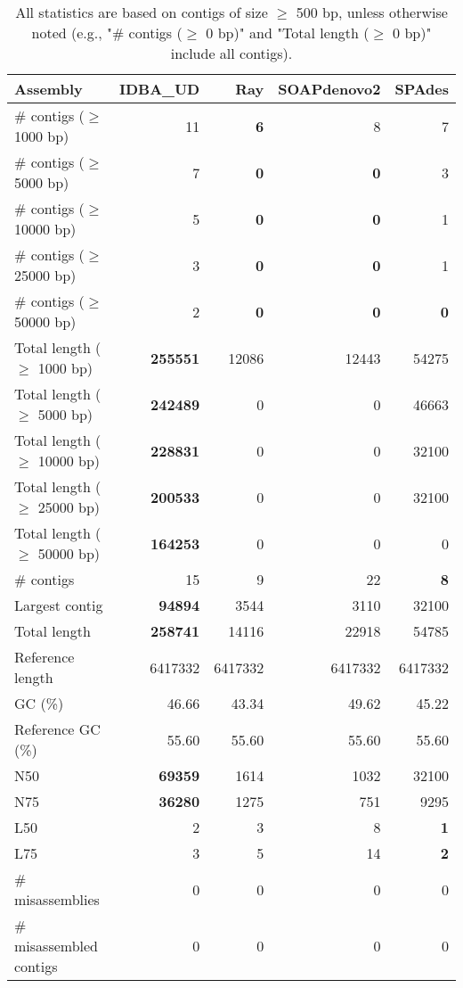 \documentclass[12pt,a4paper]{article}
\begin{document}
\begin{table}[ht]
\begin{center}
\caption{All statistics are based on contigs of size $\geq$ 500 bp, unless otherwise noted (e.g., "\# contigs ($\geq$ 0 bp)" and "Total length ($\geq$ 0 bp)" include all contigs).}
\begin{tabular}{|l*{4}{|r}|}
\hline
Assembly & IDBA\_UD & Ray & SOAPdenovo2 & SPAdes \\ \hline
\# contigs ($\geq$ 1000 bp) & 11 & {\bf 6} & 8 & 7 \\ \hline
\# contigs ($\geq$ 5000 bp) & 7 & {\bf 0} & {\bf 0} & 3 \\ \hline
\# contigs ($\geq$ 10000 bp) & 5 & {\bf 0} & {\bf 0} & 1 \\ \hline
\# contigs ($\geq$ 25000 bp) & 3 & {\bf 0} & {\bf 0} & 1 \\ \hline
\# contigs ($\geq$ 50000 bp) & 2 & {\bf 0} & {\bf 0} & {\bf 0} \\ \hline
Total length ($\geq$ 1000 bp) & {\bf 255551} & 12086 & 12443 & 54275 \\ \hline
Total length ($\geq$ 5000 bp) & {\bf 242489} & 0 & 0 & 46663 \\ \hline
Total length ($\geq$ 10000 bp) & {\bf 228831} & 0 & 0 & 32100 \\ \hline
Total length ($\geq$ 25000 bp) & {\bf 200533} & 0 & 0 & 32100 \\ \hline
Total length ($\geq$ 50000 bp) & {\bf 164253} & 0 & 0 & 0 \\ \hline
\# contigs & 15 & 9 & 22 & {\bf 8} \\ \hline
Largest contig & {\bf 94894} & 3544 & 3110 & 32100 \\ \hline
Total length & {\bf 258741} & 14116 & 22918 & 54785 \\ \hline
Reference length & 6417332 & 6417332 & 6417332 & 6417332 \\ \hline
GC (\%) & 46.66 & 43.34 & 49.62 & 45.22 \\ \hline
Reference GC (\%) & 55.60 & 55.60 & 55.60 & 55.60 \\ \hline
N50 & {\bf 69359} & 1614 & 1032 & 32100 \\ \hline
N75 & {\bf 36280} & 1275 & 751 & 9295 \\ \hline
L50 & 2 & 3 & 8 & {\bf 1} \\ \hline
L75 & 3 & 5 & 14 & {\bf 2} \\ \hline
\# misassemblies & 0 & 0 & 0 & 0 \\ \hline
\# misassembled contigs & 0 & 0 & 0 & 0 \\ \hline

\end{tabular}
\end{center}
\end{table}
\end{document}
